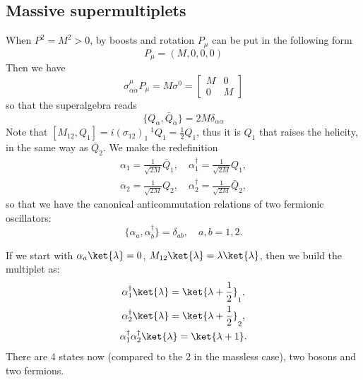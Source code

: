 \subsection{Massive supermultiplets}
When $P^2=M^2>0$, by boosts and rotation $P_\mu$ can be put in the following
form
\begin{equation}
  P_\mu = (M,0,0,0)
\end{equation}
Then we have
\begin{equation}
  \sigma_{\alpha\dot{\alpha}}^\mu P_\mu = M\sigma^0 = 
  \begin{bmatrix} 
    M & 0\\
    0 & M
  \end{bmatrix}
\end{equation}
so that the superalgebra reads
\begin{equation}
  \{Q_\alpha, \bar{Q}_{\dot{\alpha}}\} = 2 M\delta_{\alpha\dot{\alpha}}
\end{equation}
Note that $[M_{12}, Q_1] = i(\sigma_{12})_1\ ^1Q_1= \frac{1}{2}Q_1$, thus it is
$Q_1$ that raises the helicity, in the same way as $\bar{Q}_{\dot{2}}$. We make
the redefinition
\begin{gather}
  \alpha_1 = \frac{1}{\sqrt{2M}}\bar{Q}_{\dot{1}},\quad \alpha_1^\dagger
  = \frac{1}{\sqrt{2M}}Q_1, \\
  \alpha_2 = \frac{1}{\sqrt{2M}}Q_2,\quad \alpha_2^\dagger
  = \frac{1}{\sqrt{2M}}\bar{Q}_{\dot{2}},
\end{gather}
so that we have the canonical anticommutation relations of two fermionic
oscillators:
\begin{equation}
  \{\alpha_a,\alpha_b^\dagger\}=\delta_{ab},\quad a,b = 1,2.
\end{equation}
\par If we start with $\alpha_a\ket{\lambda} = 0$, $M_{12}\ket{\lambda}
= \lambda\ket{\lambda}$, then we build the multiplet as:
\begin{gather}
  \alpha_1^\dagger\ket{\lambda} = \ket{\lambda + \frac{1}{2}}_1,\\
  \alpha_2^\dagger\ket{\lambda} = \ket{\lambda+\frac{1}{2}}_2,\\
  \alpha_1^\dagger\alpha_2^\dagger\ket{\lambda} = \ket{\lambda+1}.
\end{gather}
There are 4 states now (compared to the 2 in the massless case), two bosons and
two fermions. 
